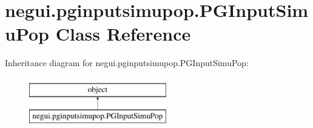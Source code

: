 \hypertarget{classnegui_1_1pginputsimupop_1_1PGInputSimuPop}{}\section{negui.\+pginputsimupop.\+P\+G\+Input\+Simu\+Pop Class Reference}
\label{classnegui_1_1pginputsimupop_1_1PGInputSimuPop}
Inheritance diagram for negui.\+pginputsimupop.\+P\+G\+Input\+Simu\+Pop\+:\begin{figure}[H]
\begin{center}
\leavevmode
\includegraphics[height=2.000000cm]{classnegui_1_1pginputsimupop_1_1PGInputSimuPop}
\end{center}
\end{figure}
